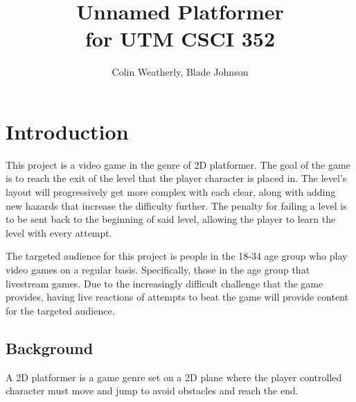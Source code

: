 \documentclass[10pt,conference,onecolumn,compsoc]{IEEEtran}
\begin{document}
\title{Unnamed Platformer\\ for UTM CSCI 352}
%
%


\author{Colin Weatherly, Blade Johnson%
}



\maketitle



\IEEEdisplaynontitleabstractindextext

\IEEEpeerreviewmaketitle



\section{Introduction}



This project is a video game in the genre of 2D platformer. The goal of the game is to reach the exit of the level that the player character is placed in. The level’s layout will progressively get more complex with each clear, along with adding new hazards that increase the difficulty further. The penalty for failing a level is to be sent back to the beginning of said level, allowing the player to learn the level with every attempt.

The targeted audience for this project is people in the 18-34 age group who play video games on a regular basis. Specifically, those in the age group that livestream games. Due to the increasingly difficult challenge that the game provides, having live reactions of attempts to beat the game will provide content for the targeted audience.



\subsection{Background}
A 2D platformer is a game genre set on a 2D plane where the player controlled character must move and jump to avoid obstacles and reach the end.
\end{document}
